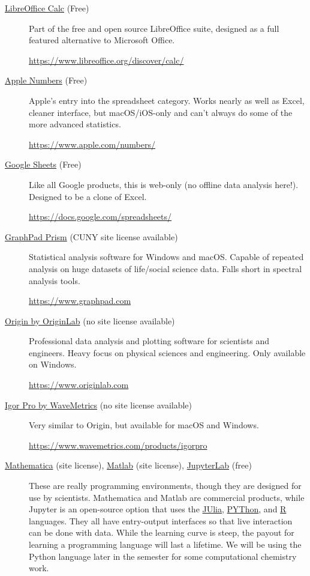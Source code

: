 \documentclass[nobib,nofonts,nols,nohyper]{tufte-handout}
\begin{document}
\begin{description}
	\item [\href{https://www.libreoffice.org/discover/calc/}{LibreOffice Calc} (Free)] Part of the free and open source LibreOffice suite, designed as a full featured alternative to Microsoft Office.
	
	\url{https://www.libreoffice.org/discover/calc/}
	
	\item [\href{https://www.apple.com/numbers/}{Apple Numbers} (Free)] Apple's entry into the spreadsheet category. 
	Works nearly as well as Excel, cleaner interface, but macOS/iOS-only and can't always do some of the more advanced statistics.
	
	\url{https://www.apple.com/numbers/}
	
	\item[\href{https://docs.google.com/spreadsheets/}{Google Sheets} (Free)] Like all Google products, this is web-only (no offline data analysis here!). 
	Designed to be a clone of Excel.
	
	\url{https://docs.google.com/spreadsheets/}
	
	\item[\href{https://www.graphpad.com}{GraphPad Prism} (CUNY site license available)] Statistical analysis software for Windows and macOS. 
	Capable of repeated analysis on huge datasets of life/social science data. 
	Falls short in spectral analysis tools.
	
	\url{https://www.graphpad.com}
	
	\item[\href{https://www.originlab.com}{Origin by OriginLab} (no site license available)] Professional data analysis and plotting software for scientists and engineers. 
	Heavy focus on physical sciences and engineering. 
	Only available on Windows. 
	
	\url{https://www.originlab.com}
	
	\item[\href{https://www.wavemetrics.com/products/igorpro}{Igor Pro by WaveMetrics} (no site license available)] Very similar to Origin, but available for macOS and Windows.
	
	\url{https://www.wavemetrics.com/products/igorpro}
	
	\item[\href{http://www.wolfram.com/mathematica/}{Mathematica} (site license), 
	\href{https://www.mathworks.com/products/matlab.html}{Matlab} (site license), 
	\href{https://jupyter.org}{JupyterLab} (free)] 
	These are really programming environments, though they are designed for use by scientists. Mathematica and Matlab are commercial products, while Jupyter is an open-source option that uses the \href{https://julialang.org}{JUlia},
  \href{https://www.python.org}{PYThon}, and \href{https://www.r-project.org}{R} languages. 
	They all have entry-output interfaces so that live interaction can be done with data. 
	While the learning curve is steep, the payout for learning a programming language will last a lifetime. 
	We will be using the Python language later in the semester for some computational chemistry work.
	

\end{description}
\end{document}
